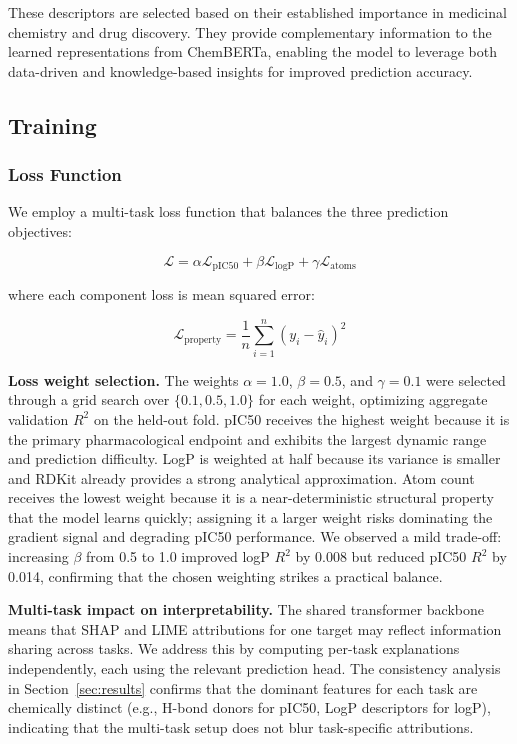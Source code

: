 \documentclass[preprint,12pt]{elsarticle}
\begin{document}
These descriptors are selected based on their established importance in medicinal chemistry and drug discovery. They provide complementary information to the learned representations from ChemBERTa, enabling the model to leverage both data-driven and knowledge-based insights for improved prediction accuracy.

\subsection{Training}

\subsubsection*{Loss Function}

We employ a multi-task loss function that balances the three prediction objectives:

\begin{equation}
\mathcal{L} = \alpha \mathcal{L}_{\text{pIC50}} + \beta \mathcal{L}_{\text{logP}} + \gamma \mathcal{L}_{\text{atoms}}
\end{equation}

where each component loss is mean squared error:

\begin{equation}
\mathcal{L}_{\text{property}} = \frac{1}{n} \sum_{i=1}^{n} (y_i - \hat{y}_i)^2
\end{equation}

\textbf{Loss weight selection.}
The weights $\alpha = 1.0$, $\beta = 0.5$, and $\gamma = 0.1$ were selected through a grid search over $\{0.1, 0.5, 1.0\}$ for each weight, optimizing aggregate validation $R^2$ on the held-out fold. pIC50 receives the highest weight because it is the primary pharmacological endpoint and exhibits the largest dynamic range and prediction difficulty. LogP is weighted at half because its variance is smaller and RDKit already provides a strong analytical approximation. Atom count receives the lowest weight because it is a near-deterministic structural property that the model learns quickly; assigning it a larger weight risks dominating the gradient signal and degrading pIC50 performance. We observed a mild trade-off: increasing $\beta$ from 0.5 to 1.0 improved logP $R^2$ by 0.008 but reduced pIC50 $R^2$ by 0.014, confirming that the chosen weighting strikes a practical balance.

\textbf{Multi-task impact on interpretability.}
The shared transformer backbone means that SHAP and LIME attributions for one target may reflect information sharing across tasks. We address this by computing per-task explanations independently, each using the relevant prediction head. The consistency analysis in Section~\ref{sec:results} confirms that the dominant features for each task are chemically distinct (e.g., H-bond donors for pIC50, LogP descriptors for logP), indicating that the multi-task setup does not blur task-specific attributions.
\end{document}
